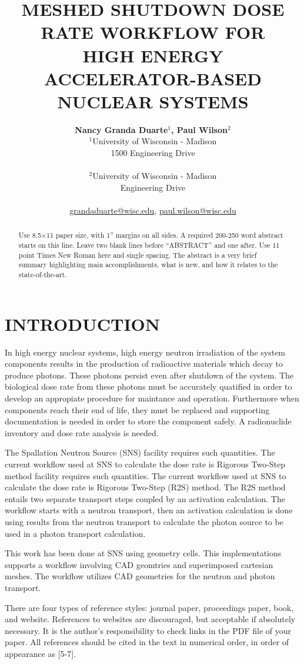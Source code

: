 \documentclass[letterpaper]{mandc2019}
\title{ MESHED SHUTDOWN DOSE RATE WORKFLOW FOR  \\
  HIGH ENERGY ACCELERATOR-BASED NUCLEAR SYSTEMS}
\author{%
  \textbf{Nancy Granda Duarte$^1$, Paul Wilson$^2$} \\%
  $^1$University of Wisconsin - Madison  \\
  1500 Engineering Drive \\ 
\\
  $^2$University of Wisconsin - Madison  \\ 
    Engineering Drive \\ 
\\
  \url{grandaduarte@wisc.edu}, \url{paul.wilson@wisc.edu}
}
\begin{document}
\maketitle
\justify 

\begin{abstract}
  Use 8.5$\times$11 paper size, with 1'' margins on all sides.  A required 200-250 
  word abstract starts on this line.  Leave two blank lines before ``ABSTRACT''
  and one after.  Use 11 point Times New Roman here and single 
  spacing. The abstract is a very brief summary highlighting main 
  accomplishments, what is new, and how it relates to the state-of-the-art.
\end{abstract}

\section{INTRODUCTION} 
In high energy nuclear systems, high energy neutron irradiation of the system 
components results in the production of radioactive materials which decay to 
produce photons. These photons persist even after shutdown of the 
system. The biological dose rate from these photons must be accurately 
quatified in order to develop an appropiate procedure for maintance and operation. 
Furthermore when components reach their end of life, they must be 
replaced and supporting documentation is needed in order to store the 
component safely. A radionuclide inventory and dose rate analysis is needed. 

The Spallation Neutron Source (SNS) facility requires such quantities. 
The current workflow  used at SNS to calculate the dose rate is Rigorous 
Two-Step method facility requires such quantities. 
The current workflow  used at SNS to calculate the dose rate is Rigorous 
Two-Step (R2S) method. The R2S method entails two separate transport steps 
coupled by an activation calculation. The workflow starts with a neutron 
transport, then an activation calculation is done using results 
from the neutron transport to calculate the  
photon source to be used in a photon transport calculation. 

This work has been done at SNS using geometry cells. 
This implementations supports a workflow involving CAD geomtries  and 
superimposed cartesian meshes. 
The workflow utilizes CAD geometries for the neutron and photon transport. 


There are four types of reference styles: journal paper\cite{journal}, 
proceedings paper\cite{proc_paper}, book\cite{book}, and website\cite{website}.
References to websites are discouraged, but acceptable if absolutely necessary. It 
is the author’s responsibility to check links in the PDF file of your paper. 
All references should be cited in the text in numerical order, in order of 
appearance as [5-7].
\end{document}
